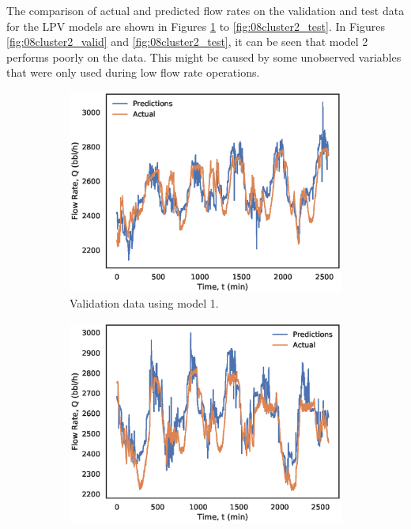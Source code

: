 The comparison of actual and predicted flow rates on the validation and test data for the LPV models are shown in Figures \ref{fig:08cluster1_valid} to \ref{fig:08cluster2_test}. In Figures \ref{fig:08cluster2_valid} and \ref{fig:08cluster2_test}, it can be seen that model 2 performs poorly on the data.  This might be caused by some unobserved variables that were only used during low flow rate operations.
\begin{figure}[h]
    \centering
     \begin{subfigure}[b]{0.48\textwidth}
         \includegraphics[width=\textwidth]{images/suncor/08cluster1_valid.eps}
         \caption{Validation data using model 1.}
         \label{fig:08cluster1_valid}
     \end{subfigure}
     \begin{subfigure}[b]{0.48\textwidth}
         \includegraphics[width=\textwidth]{images/suncor/08cluster1_test.eps}

\end{subfigure}
\end{figure}
